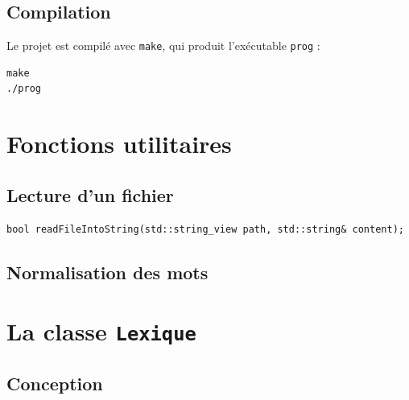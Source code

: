 \documentclass[a4paper,12pt,french]{article}
\begin{document}
\subsection{Compilation}

Le projet est compilé avec \texttt{make}, qui produit l'exécutable \texttt{prog} :

\begin{lstlisting}[style=shell]
make
./prog
\end{lstlisting}



\section{Fonctions utilitaires}

\subsection{Lecture d'un fichier}

\begin{lstlisting}
bool readFileIntoString(std::string_view path, std::string& content);
\end{lstlisting}

\subsection{Normalisation des mots}




\section{La classe \texttt{Lexique}}
\subsection{Conception}

\end{document}
